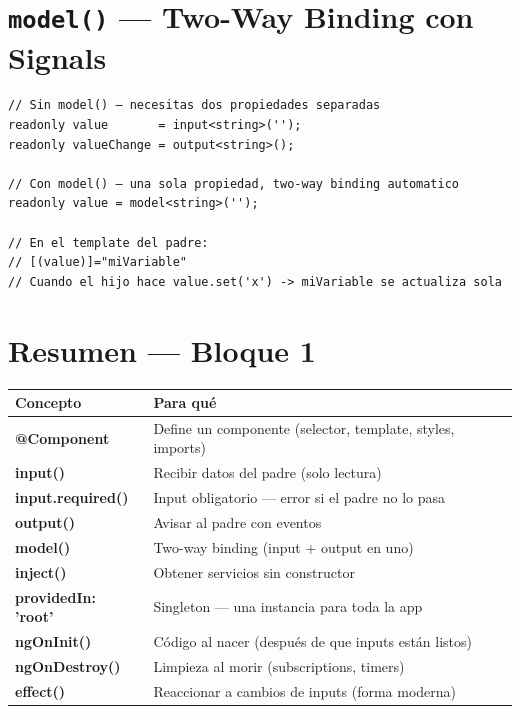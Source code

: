 \documentclass[12pt, a4paper]{article}
\begin{document}
\section{  \texttt{model()} — Two-Way Binding con Signals}

\begin{lstlisting}
// Sin model() — necesitas dos propiedades separadas
readonly value       = input<string>('');
readonly valueChange = output<string>();

// Con model() — una sola propiedad, two-way binding automatico
readonly value = model<string>('');

// En el template del padre:
// [(value)]="miVariable"
// Cuando el hijo hace value.set('x') -> miVariable se actualiza sola
\end{lstlisting}

\section{  Resumen — Bloque 1}

\begin{center}
\renewcommand{\arraystretch}{1.6}
\begin{tabular}{>{\ttfamily\bfseries}p{4cm} p{8.5cm}}
\toprule
Concepto & Para qué \\
\midrule
@Component & Define un componente (selector, template, styles, imports) \\
input() & Recibir datos del padre (solo lectura) \\
input.required() & Input obligatorio — error si el padre no lo pasa \\
output() & Avisar al padre con eventos \\
model() & Two-way binding (input + output en uno) \\
inject() & Obtener servicios sin constructor \\
providedIn: 'root' & Singleton — una instancia para toda la app \\
ngOnInit() & Código al nacer (después de que inputs están listos) \\
ngOnDestroy() & Limpieza al morir (subscriptions, timers) \\
effect() & Reaccionar a cambios de inputs (forma moderna) \\
\bottomrule
\end{tabular}
\end{center}

\newpage
\end{document}
